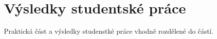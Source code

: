 \chapter{Výsledky studentské práce}

Praktická část a výsledky studenstké práce vhodně rozdělené do částí.
